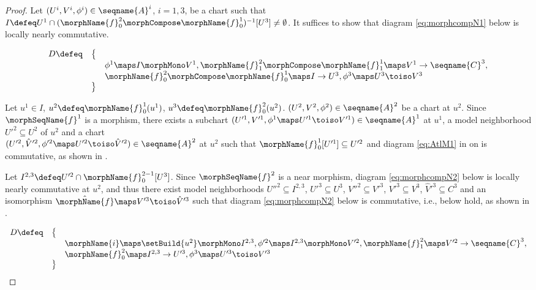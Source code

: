 \documentclass{article}
\begin{document}
\begin{lemma}
\begin{enumerate}
\begin{proof}
Let $(U^i, V^i, \phi^i) \in \seqname{A}^i$, $i=1,3$, be a chart such
that
$
  I \defeq
  U^1 \cap (\morphName{f}^2_0 \morphCompose \morphName{f}^1_0)^{-1}[U^3]
  \neq \emptyset
$.
It suffices to show that diagram \eqref{eq:morphcompN1} below is locally
nearly commutative.

\begin{equation}
\label{eq:morphcompN1}
\begin{array} {lll}
D \defeq & \bigl \{
\\
  &&
  \phi^1 \maps I \morphMono V^1,
  \morphName{f}^2_1 \morphCompose \morphName{f}^1_1 \maps  V^1 \to \seqname{C}^3,
\\
  &&
  \morphName{f}^2_0 \morphCompose \morphName{f}^1_0 \maps  I \to U^3,
  \phi^3 \maps U^3 \toiso V^3
\\
& \bigr \}
\end{array}
\end{equation}

Let $u^1 \in I$, $u^2 \defeq \morphName{f}^1_0(u^1)$,
$u^3 \defeq \morphName{f}^2_0(u^2)$.
$(U^2, V^2, \phi^2) \in \seqname{A}^2$ be a chart at $u^2$. Since
$\morphSeqName{f}^1$ is a morphism, there exists a subchart
$
  (U'^1, V'^1, \phi^1 \maps U'^1 \toiso V'^1)
  \in \seqname{A}^1
$
at $u^1$, a model neighborhood $U'^2 \subseteq U^2$ of $u^2$ and a chart \\
$
  (U'^2 ,\hat{V}'^2, \phi'^2 \maps U'^2 \toiso \hat{V}'^2)
  \in \seqname{A}^2
$
at $u^2$ such that $\morphName{f}^1_0[U'^1] \subseteq U'^2$ and diagram
\eqref{eq:AtlM1} in  on  is
commutative, as shown in .

Let $I^{2,3} \defeq U'^2 \cap \morphName{f}^{2-1}_0[U^3]$. Since
$\morphSeqName{f}^2$ is a near morphism, diagram \eqref{eq:morphcompN2} below
is locally nearly commutative at $u^2$, and thus there exist model
neighborhoods $U''^2 \subseteq I^{2,3}$, $U'^3 \subseteq U^3$,
$V''^2 \subseteq V'^3$,
$V'^3 \subseteq V^3$, $\hat{V}'^3 \subseteq C^3$ and an isomorphism
$\hat{\morphName{f}} \maps V'^3 \toiso \hat{V}'^3$\! such that diagram
\eqref{eq:morphcompN2} below is commutative, i.e.,
 below hold, as shown in
{
  \showlabelsinline
  .
}

\begin{equation}
\label{eq:morphcompN2}
\begin{array} {lll}
D \defeq & \bigl \{
\\
  &&
  \morphName{i} \maps \setBuild{u^2} \morphMono I^{2,3},
  \phi'^2 \maps I^{2,3} \morphMono V'^2,
  \morphName{f}^2_1 \maps  V'^2 \to \seqname{C}^3,
\\
  &&
  \morphName{f}^2_0 \maps I^{2,3} \to U'^3,
  \phi^3 \maps U'^3 \toiso V'^3
\\
& \bigr \}
\end{array}
\end{equation}


\end{proof}
\end{enumerate}
\end{lemma}
\end{document}
